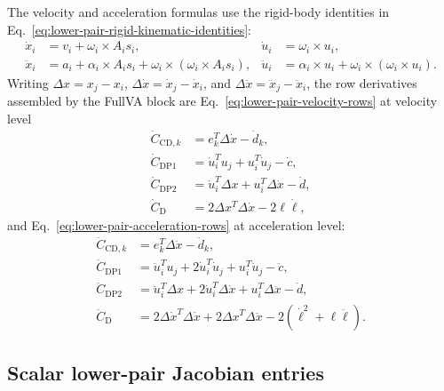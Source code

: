 \documentclass[preprint,12pt]{elsarticle}
\begin{document}
The velocity and acceleration formulas use the rigid-body identities in
Eq.~\eqref{eq:lower-pair-rigid-kinematic-identities}:
\begin{align}
  \dot x_i &= v_i+\omega_i\times A_i s_i,&
  \dot u_i &= \omega_i\times u_i,\\
  \ddot x_i &= a_i+\alpha_i\times A_i s_i+
    \omega_i\times\left(\omega_i\times A_i s_i\right),&
  \ddot u_i &= \alpha_i\times u_i+
    \omega_i\times\left(\omega_i\times u_i\right).
  \label{eq:lower-pair-rigid-kinematic-identities}
\end{align}
Writing $\Delta x=x_j-x_i$, $\Delta\dot x=\dot x_j-\dot x_i$, and
$\Delta\ddot x=\ddot x_j-\ddot x_i$, the row derivatives assembled by the
FullVA block are Eq.~\eqref{eq:lower-pair-velocity-rows} at velocity level
\begin{align}
  \dot C_{\mathrm{CD},k}
    &= e_k^T\Delta\dot x-\dot d_k,\\
  \dot C_{\mathrm{DP1}}
    &= \dot u_i^T u_j+u_i^T\dot u_j-\dot c,\\
  \dot C_{\mathrm{DP2}}
    &= \dot u_i^T\Delta x+u_i^T\Delta\dot x-\dot d,\\
  \dot C_{\mathrm{D}}
    &= 2\Delta x^T\Delta\dot x-2\ell\dot\ell,
  \label{eq:lower-pair-velocity-rows}
\end{align}
and Eq.~\eqref{eq:lower-pair-acceleration-rows} at acceleration level:
\begin{align}
  \ddot C_{\mathrm{CD},k}
    &= e_k^T\Delta\ddot x-\ddot d_k,\\
  \ddot C_{\mathrm{DP1}}
    &= \ddot u_i^T u_j+2\dot u_i^T\dot u_j+u_i^T\ddot u_j-\ddot c,\\
  \ddot C_{\mathrm{DP2}}
    &= \ddot u_i^T\Delta x+2\dot u_i^T\Delta\dot x+
       u_i^T\Delta\ddot x-\ddot d,\\
  \ddot C_{\mathrm{D}}
    &= 2\Delta\dot x^T\Delta\dot x+
       2\Delta x^T\Delta\ddot x-
       2\left(\dot\ell^2+\ell\ddot\ell\right).
  \label{eq:lower-pair-acceleration-rows}
\end{align}

\subsection{Scalar lower-pair Jacobian entries}
\end{document}
